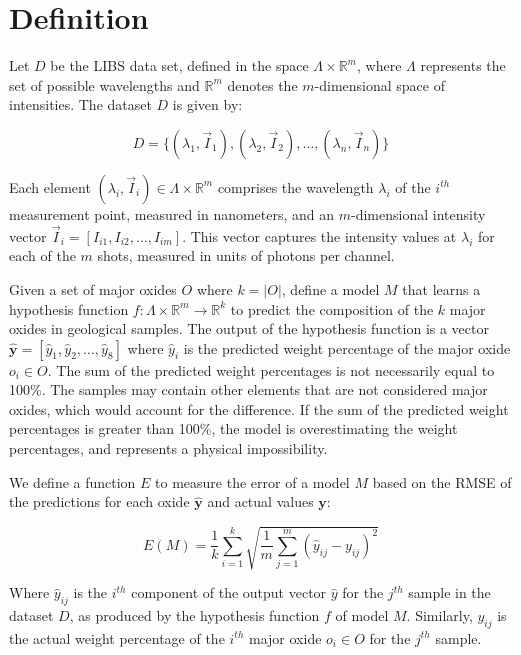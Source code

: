 \section{Definition}\label{sec:definition}
Let $D$ be the LIBS data set, defined in the space $\Lambda \times \mathbb{R}^m$, where $\Lambda$ represents the set of possible wavelengths and $\mathbb{R}^m$ denotes the $m$-dimensional space of intensities.
The dataset $D$ is given by:

\begin{equation}
    D = \{ (\lambda_1, \vec{I}_1), (\lambda_2, \vec{I}_2), \ldots, (\lambda_n, \vec{I}_n) \}
\end{equation}

Each element $(\lambda_i, \vec{I}_i) \in \Lambda \times \mathbb{R}^{m}$ comprises the wavelength $\lambda_i$ of the $i^{th}$ measurement point, measured in nanometers, and an $m$-dimensional intensity vector $\vec{I}_i = [I_{i1}, I_{i2}, \ldots, I_{im}]$.
This vector captures the intensity values at $\lambda_i$ for each of the $m$ shots, measured in units of photons per channel.

Given a set of major oxides $O$ where $k=|O|$, define a model $M$ that learns a hypothesis function $f: \Lambda \times \mathbb{R}^m \rightarrow \mathbb{R}^k$ to predict the composition of the $k$ major oxides in geological samples.
The output of the hypothesis function is a vector $\mathbf{\hat{y}} = [\hat{y}_{1}, \hat{y}_{2}, \ldots, \hat{y}_{8}]$ where $\hat{y}_{i}$ is the predicted weight percentage of the major oxide $o_i \in O$.
The sum of the predicted weight percentages is not necessarily equal to 100\%.
The samples may contain other elements that are not considered major oxides, which would account for the difference.
If the sum of the predicted weight percentages is greater than 100\%, the model is overestimating the weight percentages, and represents a physical impossibility.

We define a function $E$ to measure the error of a model $M$ based on the RMSE of the predictions for each oxide $\mathbf{\hat{y}}$ and actual values $\mathbf{y}$:

\begin{equation}
    E(M) = \frac{1}{k} \sum_{i=1}^{k} \sqrt{\frac{1}{m} \sum_{j=1}^{m} (\hat{y}_{ij} - y_{ij})^2}
\end{equation}

Where \( \hat{y}_{ij} \) is the \( i^{th} \) component of the output vector \( \hat{y} \) for the \( j^{th} \) sample in the dataset \( D \), as produced by the hypothesis function \( f \) of model \( M \). Similarly, \( y_{ij} \) is the actual weight percentage of the \( i^{th} \) major oxide \( o_i \in O \) for the \( j^{th} \) sample.

